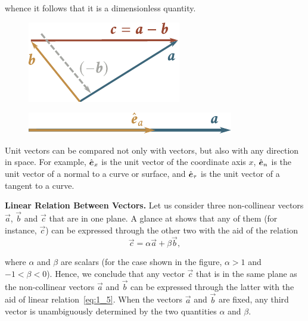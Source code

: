 \noindent
whence it follows that it is a dimensionless quantity.

\begin{figure}[t]
	\begin{minipage}[t]{0.5\linewidth}
		\begin{center}
			\includegraphics[scale=0.9]{figures/ch_01/fig_1_7.pdf}
			\caption[]{}
			\label{fig:1_7}
		\end{center}
	\end{minipage}
	\hfill{ }%
	\begin{minipage}[t]{0.5\linewidth}
		\begin{center}
			\includegraphics[scale=0.95]{figures/ch_01/fig_1_8.pdf}
			\caption[]{}
			\label{fig:1_8}
		\end{center}
	\end{minipage}
\vspace{-0.6cm}
\end{figure}

Unit vectors can be compared not only with vectors, but also with any direction in space. For example, $\hat{\boldsymbol{e}}_{x}$ is the unit vector of the coordinate axis $x$, $\hat{\boldsymbol{e}}_{n}$ is the unit vector of a normal to a curve or surface, and $\hat{\boldsymbol{e}}_{\tau}$ is the unit vector of a tangent to a curve.

\textbf{Linear Relation Between Vectors.} Let us consider three non-collinear vectors $\vec{a}$, $\vec{b}$ and $\vec{c}$ that are in one plane. A glance at  shows that any of them (for instance, $\vec{c}$) can be expressed through the other two with the aid of the relation
\begin{equation}\label{eq:1_5}
\vec{c} = \alpha\vec{a} + \beta\vec{b},
\end{equation}

\noindent
where $\alpha$ and $\beta$ are scalars (for the case shown in the figure, $\alpha>1$ and $-1<\beta<0$). Hence, we conclude that any vector $\vec{c}$ that is in the same plane as the non-collinear vectors $\vec{a}$ and $\vec{b}$ can be expressed through the latter with the aid of linear relation~\eqref{eq:1_5}. When the vectors $\vec{a}$ and $\vec{b}$ are fixed, any third vector is unambiguously determined by the two quantities $\alpha$ and $\beta$.


